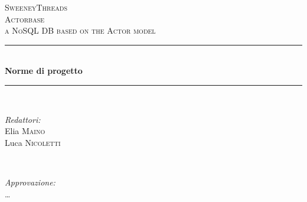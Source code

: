 \documentclass[a4paper]{report}
\begin{document}
	
	\begin{titlepage}
		\newcommand{\HRule}{\rule{\linewidth}{0.5mm}} 
		\center  
		
		\textsc{\LARGE SweeneyThreads}\\[1.5cm] 
		\textsc{\Large Actorbase}\\[0.5cm] 
		\textsc{\large a NoSQL DB based on the Actor model}\\[0.5cm]
		
		
		\HRule \\[0.4cm]
		{ \huge \bfseries Norme di progetto}\\[0.4cm] 
		\HRule \\[1.5cm]
		
		\begin{minipage}{0.4\textwidth}
			\begin{flushleft} \large
				\emph{Redattori:}\\
				Elia \textsc{Maino} \\
				Luca \textsc{Nicoletti} \\
			\end{flushleft}
		\end{minipage}
		~
		\begin{minipage}{0.4\textwidth}
			\begin{flushright} \large
				\emph{Approvazione:} \\
				\dots
			\end{flushright}
		\end{minipage}
		

\end{titlepage}
\end{document}
